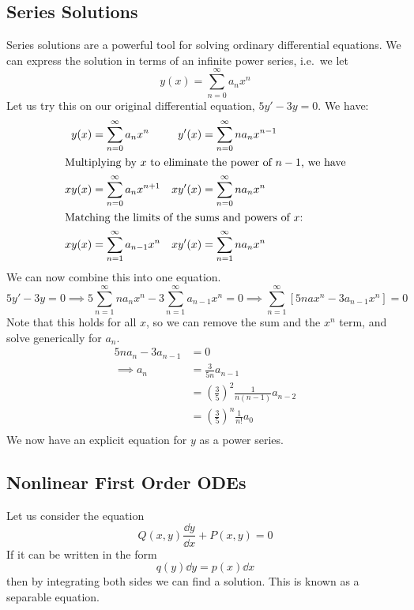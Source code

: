 \subsection{Series Solutions}
Series solutions are a powerful tool for solving ordinary differential equations.
We can express the solution in terms of an infinite power series, i.e.\ we let
\[
	y(x) = \sum_{n=0}^\infty a_nx^n
\]
Let us try this on our original differential equation, \(5y' - 3y = 0\).
We have:
\begin{align*}
	y(x)  & = \sum_{n=0}^\infty a_nx^n     & y'(x)  & = \sum_{n=0}^\infty na_nx^{n-1} \\
	\intertext{Multiplying by \(x\) to eliminate the power of \(n-1\), we have}
	xy(x) & = \sum_{n=0}^\infty a_nx^{n+1} & xy'(x) & = \sum_{n=0}^\infty na_nx^n     \\
	\intertext{Matching the limits of the sums and powers of \(x\):}
	xy(x) & = \sum_{n=1}^\infty a_{n-1}x^n & xy'(x) & = \sum_{n=1}^\infty na_nx^n     \\
\end{align*}
We can now combine this into one equation.
\[
	5y' - 3y = 0 \implies 5\sum_{n=1}^\infty na_nx^n - 3\sum_{n=1}^\infty a_{n-1}x^n = 0 \implies \sum_{n=1}^\infty \left[ 5nax^n - 3a_{n-1}x^n \right] = 0
\]
Note that this holds for all \(x\), so we can remove the sum and the \(x^n\) term, and solve generically for \(a_n\).
\begin{align*}
	5na_n - 3a_{n-1} & = 0                                                   \\
	\implies a_n     & = \frac{3}{5n} a_{n-1}                                \\
	                 & = \left(\frac{3}{5}\right)^2 \frac{1}{n(n-1)} a_{n-2} \\
	                 & = \left(\frac{3}{5}\right)^n \frac{1}{n!} a_{0}       \\
\end{align*}
We now have an explicit equation for \(y\) as a power series.

\subsection{Nonlinear First Order ODEs}
Let us consider the equation
\[
	Q(x, y)\frac{\dd{y}}{\dd{x}} + P(x, y) = 0
\]
If it can be written in the form
\[
	q(y) \dd{y} = p(x) \dd{x}
\]
then by integrating both sides we can find a solution.
This is known as a separable equation.

